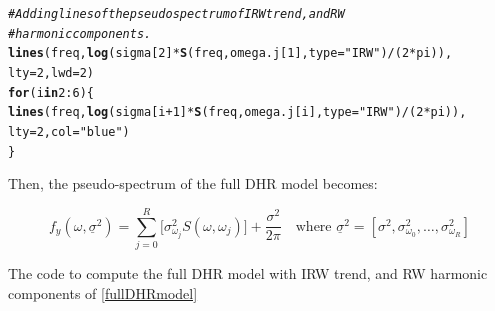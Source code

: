 \documentclass{article}\usepackage[]{graphicx}\usepackage[]{color}
\makeatletter
\newcommand{\hlnum}[1]{\textcolor[rgb]{0.686,0.059,0.569}{#1}}%
\newcommand{\hlstr}[1]{\textcolor[rgb]{0.192,0.494,0.8}{#1}}%
\newcommand{\hlcom}[1]{\textcolor[rgb]{0.678,0.584,0.686}{\textit{#1}}}%
\newcommand{\hlopt}[1]{\textcolor[rgb]{0,0,0}{#1}}%
\newcommand{\hlstd}[1]{\textcolor[rgb]{0.345,0.345,0.345}{#1}}%
\newcommand{\hlkwa}[1]{\textcolor[rgb]{0.161,0.373,0.58}{\textbf{#1}}}%
\newcommand{\hlkwc}[1]{\textcolor[rgb]{0.333,0.667,0.333}{#1}}%
\newcommand{\hlkwd}[1]{\textcolor[rgb]{0.737,0.353,0.396}{\textbf{#1}}}%
\newenvironment{kframe}{%
 \def\at@end@of@kframe{}%
 \ifinner\ifhmode%
  \def\at@end@of@kframe{\end{minipage}}%
  \begin{minipage}{\columnwidth}%
 \fi\fi%
 \def\FrameCommand##1{\hskip\@totalleftmargin \hskip-\fboxsep
 \colorbox{shadecolor}{##1}\hskip-\fboxsep
     \hskip-\linewidth \hskip-\@totalleftmargin \hskip\columnwidth}%
 \MakeFramed {\advance\hsize-\width
   \@totalleftmargin\z@ \linewidth\hsize
   \@setminipage}}%
 {\par\unskip\endMakeFramed%
 \at@end@of@kframe}
\newenvironment{knitrout}{}{} %
\makeatother
\begin{document}
\begin{knitrout}
\begin{kframe}
\begin{alltt}
\hlcom{# Adding lines of the pseudo spectrum of IRW trend, and RW }
\hlcom{# harmonic components.}
\hlkwd{lines}\hlstd{(freq,} \hlkwd{log}\hlstd{(sigma[}\hlnum{2}\hlstd{]} \hlopt{*} \hlkwd{S}\hlstd{(freq, omega.j[}\hlnum{1}\hlstd{],} \hlkwc{type} \hlstd{=} \hlstr{"IRW"}\hlstd{)}\hlopt{/}\hlstd{(}\hlnum{2}\hlopt{*}\hlstd{pi)),}
      \hlkwc{lty} \hlstd{=} \hlnum{2}\hlstd{,} \hlkwc{lwd} \hlstd{=} \hlnum{2}\hlstd{)}
\hlkwa{for}\hlstd{(i} \hlkwa{in} \hlnum{2}\hlopt{:}\hlnum{6}\hlstd{) \{}
  \hlkwd{lines}\hlstd{(freq,} \hlkwd{log}\hlstd{(sigma[i} \hlopt{+} \hlnum{1}\hlstd{]} \hlopt{*} \hlkwd{S}\hlstd{(freq, omega.j[i],} \hlkwc{type} \hlstd{=} \hlstr{"IRW"}\hlstd{)}\hlopt{/}\hlstd{(}\hlnum{2}\hlopt{*}\hlstd{pi)),}
        \hlkwc{lty} \hlstd{=} \hlnum{2}\hlstd{,} \hlkwc{col} \hlstd{=} \hlstr{"blue"}\hlstd{)}
  \hlstd{\}}
\end{alltt}
\end{kframe}
\end{knitrout}


Then, the pseudo-spectrum of the full DHR model becomes:

\begin{equation}
\label{fullDHRmodel}
\boxed{
f_y(\omega, \underline{\sigma}^2) = \sum_{j = 0}^{R} \Big[ \sigma^2_{\omega_j}S(\omega, \omega_j) \Big] + \frac{\sigma^2}{2 \pi}
} \quad \text{where } \underline{\sigma}^2 = [\sigma^2, \sigma^2_{\omega_{0}}, \dots, \sigma^2_{\omega_{R}}]
\end{equation}


The code to compute the full DHR model with IRW trend, and RW harmonic components of \eqref{fullDHRmodel}
\end{document}
